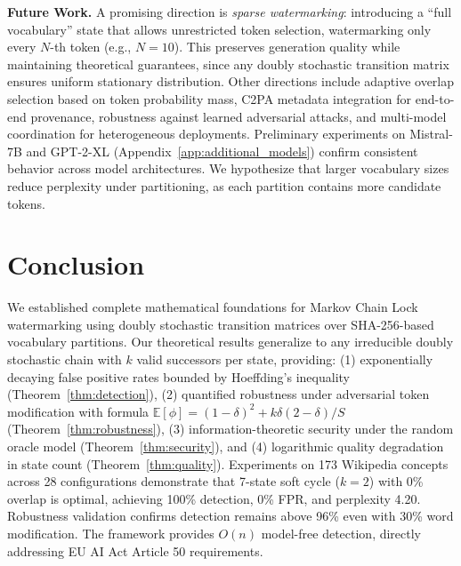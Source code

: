 \documentclass[11pt]{article}
\theoremstyle{definition}
\theoremstyle{remark}
\begin{document}
\textbf{Future Work.} A promising direction is \textit{sparse watermarking}: introducing a ``full vocabulary'' state that allows unrestricted token selection, watermarking only every $N$-th token (e.g., $N=10$). This preserves generation quality while maintaining theoretical guarantees, since any doubly stochastic transition matrix ensures uniform stationary distribution. Other directions include adaptive overlap selection based on token probability mass, C2PA metadata integration for end-to-end provenance, robustness against learned adversarial attacks, and multi-model coordination for heterogeneous deployments. Preliminary experiments on Mistral-7B and GPT-2-XL (Appendix~\ref{app:additional_models}) confirm consistent behavior across model architectures. We hypothesize that larger vocabulary sizes reduce perplexity under partitioning, as each partition contains more candidate tokens.



\section{Conclusion}

We established complete mathematical foundations for Markov Chain Lock watermarking using doubly stochastic transition matrices over SHA-256-based vocabulary partitions. Our theoretical results generalize to any irreducible doubly stochastic chain with $k$ valid successors per state, providing: (1) exponentially decaying false positive rates bounded by Hoeffding's inequality (Theorem~\ref{thm:detection}), (2) quantified robustness under adversarial token modification with formula $\mathbb{E}[\phi] = (1-\delta)^2 + k\delta(2-\delta)/S$ (Theorem~\ref{thm:robustness}), (3) information-theoretic security under the random oracle model (Theorem~\ref{thm:security}), and (4) logarithmic quality degradation in state count (Theorem~\ref{thm:quality}). Experiments on 173 Wikipedia concepts across 28 configurations demonstrate that 7-state soft cycle ($k=2$) with 0\% overlap is optimal, achieving 100\% detection, 0\% FPR, and perplexity 4.20. Robustness validation confirms detection remains above 96\% even with 30\% word modification. The framework provides $O(n)$ model-free detection, directly addressing EU AI Act Article 50 requirements.

\end{document}

